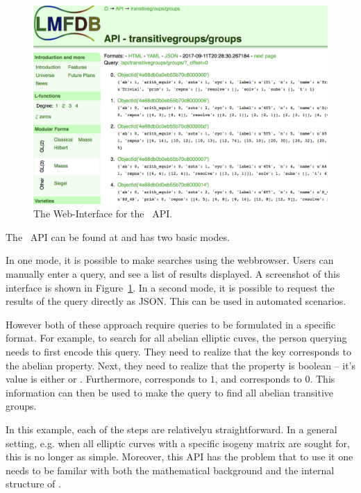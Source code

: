 \begin{figure}[h]
  \begin{center}
    \includegraphics[width=\textwidth]{APIScreenshot.png}
  \end{center}

  \caption[The Web-Interface for the \lmfdb\ API. ]{
    The Web-Interface for the \lmfdb\ API. 
  }
  \label{fig:apiscreenshot}
\end{figure}
The \lmfdb\ API can be found at  and has two basic modes. 

In one mode, it is possible to make searches using the webbrowser. 
Users can manually enter a query, and see a list of results displayed. 
A screenshot of this interface is shown in Figure~\ref{fig:apiscreenshot}. 
In a second mode, it is possible to request the results of the query directly as JSON. 
This can be used in automated scenarios. 

However both of these approach require queries to be formulated in a specific format.
For example, to search for all abelian elliptic cuves, the person querying \lmfdb needs to first encode this query. 
They need to realize that the  key corresponds to the abelian property. 
Next, they need to realize that the property is boolean -- it's value is either  or . 
Furthermore,  corresponds to $1$, and  corresponds to $0$. 
This information can then be used to make the query  to find all abelian transitive groups. 

In this example, each of the steps are relativelyu straightforward. 
In a general setting, e.g. when all elliptic curves with a specific isogeny matrix are sought for, this is no longer as simple. 
Moreover, this API has the problem that to use it one needs to be familar with both the mathematical background and the internal structure of \lmfdb. 

